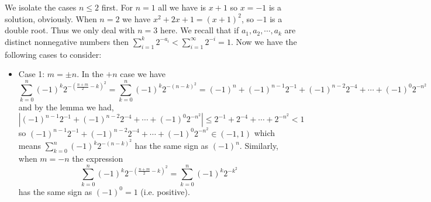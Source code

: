 \documentclass[11pt,a4paper]{article}
\newcommand{\<}{\langle}
\renewcommand{\>}{\rangle}
\newcommand{\dsum}{\displaystyle\sum}
\begin{document}
\begin{enumerate}
	We isolate the cases $n\le 2$ first. For $n=1$ all we have is $x+1$ so $x=-1$ is a solution, obviously. When $n=2$ we have $x^2+2x+1=(x+1)^2$, so $-1$ is a double root. Thus we only deal with $n=3$ here. We recall that if $a_1, a_2, \cdots , a_k$ are distinct nonnegative numbers then $\dsum_{i=1}^k 2^{-a_i} < \dsum_{i=1}^\infty 2^{-i} = 1$. Now we have the following cases to consider: 
	\begin{itemize}
		\item Case 1: $m=\pm n$. In the $+n$ case we have \[\displaystyle\sum_{k=0}^{n} (-1)^k 2^{- (\frac{n+m}{2}-k)^2} = \displaystyle\sum_{k=0}^{n} (-1)^k 2^{- (n-k)^2}=(-1)^n + (-1)^{n-1}2^{-1}
		+(-1)^{n-2}2^{-4}+\cdots + (-1)^0 2^{-n^2}
		\]
		and by the lemma we had, 
		$|(-1)^{n-1}2^{-1}
		+(-1)^{n-2}2^{-4}+\cdots + (-1)^0 2^{-n^2}|\le 2^{-1}+2^{-4}+\cdots + 2^{-n^2} < 1$
		so $(-1)^{n-1}2^{-1}
		+(-1)^{n-2}2^{-4}+\cdots + (-1)^0 2^{-n^2}\in (-1, 1)$ which means 
		$\displaystyle\sum_{k=0}^{n} (-1)^k 2^{- (n-k)^2}$ has the same sign as $(-1)^n$. 
		Similarly, when $m=-n$ the expression \[
		\displaystyle\sum_{k=0}^{n} (-1)^k 2^{- (\frac{n+m}{2}-k)^2}
		=\displaystyle\sum_{k=0}^{n} (-1)^k 2^{-k^2}
		\]
		has the same sign as $(-1)^0=1$ (i.e. positive). 
		

\end{itemize}
\end{enumerate}
\end{document}
